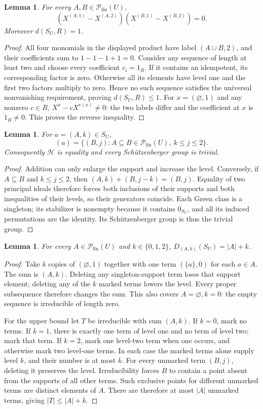 \documentclass[11pt]{article}
\newtheorem{lemma}[theorem]{Lemma}
\newcommand{\Pf}{\mathcal P_{\mathrm{fin}}}
\newcommand{\HH}{\mathcal H}
\begin{document}
\begin{lemma}\label{lem:algebra}
For every $A,B\in\Pf(U)$,
\[
 (X^{(A,1)}-X^{(A,2)})(X^{(B,1)}-X^{(B,2)})=0.
\]
Moreover $d(S_U,R)=1$.
\end{lemma}
\begin{proof}
All four monomials in the displayed product have label $(A\cup B,2)$,
and their coefficients sum to $1-1-1+1=0$.
Consider any sequence of length at least two and choose every coefficient
$c_i=1_R$. If it contains an idempotent, its corresponding factor is zero.
Otherwise all its elements have level one and the first two factors
multiply to zero. Hence no such sequence satisfies the universal
nonvanishing requirement, proving $d(S_U,R)\leq1$.
For $x=(\varnothing,1)$ and any nonzero $c\in R$,
$X^x-cX^{e(x)}\ne0$: the two labels differ and the coefficient at $x$
is $1_R\ne0$. This proves the reverse inequality.
\end{proof}

\begin{lemma}\label{lem:green}
For $a=(A,k)\in S_U$,
\[
 (a)=\{(B,j): A\subseteq B\in\Pf(U),\ k\leq j\leq2\}.
\]
Consequently $\HH$ is equality and every Sch\"utzenberger group is trivial.
\end{lemma}
\begin{proof}
Addition can only enlarge the support and increase the level. Conversely,
if $A\subseteq B$ and $k\leq j\leq2$, then
$(A,k)+(B,j-k)=(B,j)$. Equality of two principal ideals therefore forces
both inclusions of their supports and both inequalities of their levels,
so their generators coincide. Each Green class is a singleton; its
stabilizer is nonempty because it contains $0_{S_U}$, and all its induced
permutations are the identity. Its Sch\"utzenberger group is thus the
trivial group.
\end{proof}

\begin{lemma}\label{lem:relative}
For every $A\in\Pf(U)$ and $k\in\{0,1,2\}$,
$D_{(A,k)}(S_U)=|A|+k$.
\end{lemma}
\begin{proof}
Take $k$ copies of $(\varnothing,1)$ together with one term
$(\{a\},0)$ for each $a\in A$. The sum is $(A,k)$.
Deleting any singleton-support term loses that support element; deleting
any of the $k$ marked terms lowers the level. Every proper subsequence
therefore changes the sum. This also covers $A=\varnothing,k=0$:
the empty sequence is irreducible of length zero.

For the upper bound let $T$ be irreducible with sum $(A,k)$.
If $k=0$, mark no terms. If $k=1$, there is exactly one term of level one
and no term of level two; mark that term. If $k=2$, mark one level-two
term when one occurs, and otherwise mark two level-one terms.
In each case the marked terms alone supply level $k$, and their number
is at most $k$. For every unmarked term $(B,j)$, deleting it preserves
the level. Irreducibility forces $B$ to contain a point absent from
the supports of all other terms. Such exclusive points for different
unmarked terms are distinct elements of $A$. There are therefore at
most $|A|$ unmarked terms, giving $|T|\leq |A|+k$.
\end{proof}
\end{document}
